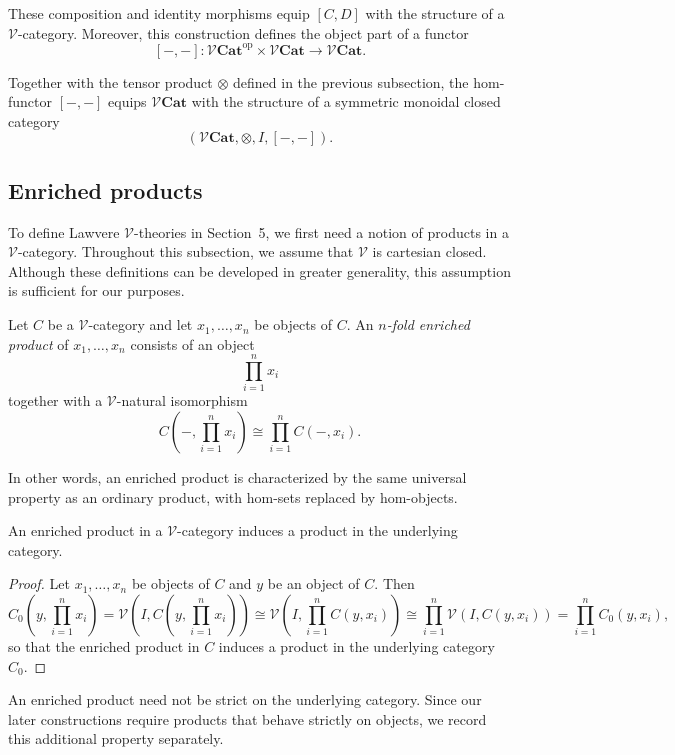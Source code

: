 \documentclass{tac}
\begin{document}
These composition and identity morphisms equip $[C,D]$ with the structure of a
$\mathcal{V}$-category. Moreover, this construction defines the object part of
a functor
\[
[-,-]:
\mathcal{V}\mathbf{Cat}^{\mathrm{op}}
\times
\mathcal{V}\mathbf{Cat}
\longrightarrow
\mathcal{V}\mathbf{Cat}.
\]

Together with the tensor product $\otimes$ defined in the previous subsection,
the hom-functor $[-,-]$ equips $\mathcal{V}\mathbf{Cat}$ with the structure of
a symmetric monoidal closed category
\[
(\mathcal{V}\mathbf{Cat},\otimes,I,[-,-]).
\]


\subsection*{Enriched products}
To define Lawvere $\mathcal{V}$-theories in Section~5, we first need a notion
of products in a $\mathcal{V}$-category. Throughout this subsection, we assume
that $\mathcal{V}$ is cartesian closed. Although these definitions can be
developed in greater generality, this assumption is sufficient for our
purposes.
\begin{definition}
Let $C$ be a $\mathcal{V}$-category and let
$x_1,\ldots,x_n$ be objects of $C$. An \emph{$n$-fold enriched product} of
$x_1,\ldots,x_n$ consists of an object
\[
\prod_{i=1}^n x_i
\]
together with a $\mathcal{V}$-natural isomorphism
\[
C\!\left(-,\prod_{i=1}^n x_i\right)
\cong
\prod_{i=1}^n C(-,x_i).
\]
\end{definition}

In other words, an enriched product is characterized by the same universal
property as an ordinary product, with hom-sets replaced by hom-objects.

\begin{lemma}
An enriched product in a $\mathcal{V}$-category induces a product in the underlying category.
\end{lemma}

\begin{proof}
Let $x_1,\ldots,x_n$ be objects of $C$ and $y$ be an object of $C$. Then
\[
C_0(y,\prod_{i=1}^n x_i)=\mathcal{V}(I,C(y,\prod_{i=1}^n x_i))\cong \mathcal{V}(I,\prod_{i=1}^nC(y,x_i))\cong \prod_{i=1}^n\mathcal{V}(I,C(y,x_i))=\prod_{i=1}^nC_0(y, x_i),
\]
so that the enriched product in $C$ induces a product in the underlying category $C_0$.
\end{proof}

An enriched product need not be strict on the underlying category. Since our
later constructions require products that behave strictly on objects, we
record this additional property separately.
\end{document}

